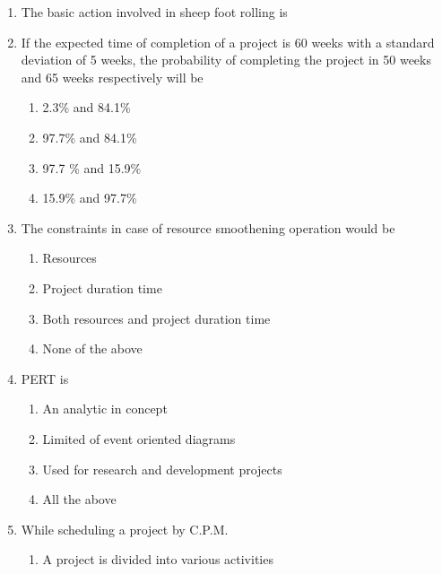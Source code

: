 \documentclass[11pt,a4paper]{article}
\begin{document}
\begin{enumerate}
\item{The basic action involved in sheep foot rolling is}
\\
\item{If the expected time of completion of a project is 60 weeks with a standard deviation of 5 weeks, the probability of completing the project in 50 weeks and 65 weeks respectively will be}
\begin{enumerate}[label=\Alph*.]
\item{2.3\% and 84.1\%}
\item{97.7\% and 84.1\%}
\item{97.7 \% and 15.9\%}
\item{15.9\% and 97.7\%}
\end{enumerate}
\item{The constraints in case of resource smoothening operation would be}
\begin{enumerate}[label=\Alph*.]
\item{Resources}
\item{Project duration time}
\item{Both resources and project duration time}
\item{None of the above}
\end{enumerate}
\item{PERT is}
\begin{enumerate}[label=\Alph*.]
\item{An analytic in concept}
\item{Limited of event oriented diagrams}
\item{Used for research and development projects}
\item{All the above}
\end{enumerate}
\item{While scheduling a project by C.P.M.}
\begin{enumerate}[label=\Alph*.]
\item{A project is divided into various activities}

\end{enumerate}
\end{enumerate}
\end{document}
